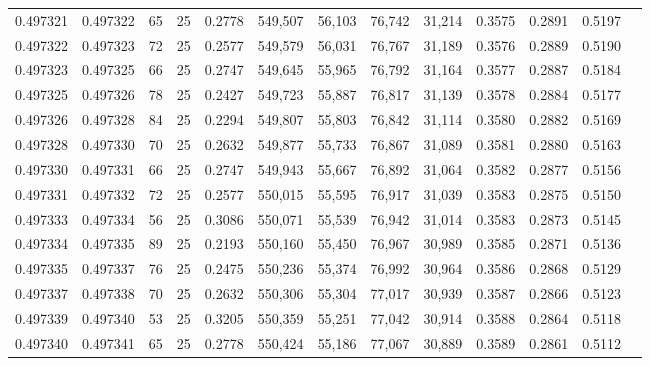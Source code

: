 \begin{tabular}{rrrrrrrrrrrrr}
0.497321 & 0.497322 &    65 &  25 &                                     0.2778 & 549,507 &  56,103 &  76,742 &  31,214 & 0.3575 & 0.2891 & 0.5197 \\
0.497322 & 0.497323 &    72 &  25 &                                     0.2577 & 549,579 &  56,031 &  76,767 &  31,189 & 0.3576 & 0.2889 & 0.5190 \\
0.497323 & 0.497325 &    66 &  25 &                                     0.2747 & 549,645 &  55,965 &  76,792 &  31,164 & 0.3577 & 0.2887 & 0.5184 \\
0.497325 & 0.497326 &    78 &  25 &                                     0.2427 & 549,723 &  55,887 &  76,817 &  31,139 & 0.3578 & 0.2884 & 0.5177 \\
0.497326 & 0.497328 &    84 &  25 &                                     0.2294 & 549,807 &  55,803 &  76,842 &  31,114 & 0.3580 & 0.2882 & 0.5169 \\
0.497328 & 0.497330 &    70 &  25 &                                     0.2632 & 549,877 &  55,733 &  76,867 &  31,089 & 0.3581 & 0.2880 & 0.5163 \\
0.497330 & 0.497331 &    66 &  25 &                                     0.2747 & 549,943 &  55,667 &  76,892 &  31,064 & 0.3582 & 0.2877 & 0.5156 \\
0.497331 & 0.497332 &    72 &  25 &                                     0.2577 & 550,015 &  55,595 &  76,917 &  31,039 & 0.3583 & 0.2875 & 0.5150 \\
0.497333 & 0.497334 &    56 &  25 &                                     0.3086 & 550,071 &  55,539 &  76,942 &  31,014 & 0.3583 & 0.2873 & 0.5145 \\
0.497334 & 0.497335 &    89 &  25 &                                     0.2193 & 550,160 &  55,450 &  76,967 &  30,989 & 0.3585 & 0.2871 & 0.5136 \\
0.497335 & 0.497337 &    76 &  25 &                                     0.2475 & 550,236 &  55,374 &  76,992 &  30,964 & 0.3586 & 0.2868 & 0.5129 \\
0.497337 & 0.497338 &    70 &  25 &                                     0.2632 & 550,306 &  55,304 &  77,017 &  30,939 & 0.3587 & 0.2866 & 0.5123 \\
0.497339 & 0.497340 &    53 &  25 &                                     0.3205 & 550,359 &  55,251 &  77,042 &  30,914 & 0.3588 & 0.2864 & 0.5118 \\
0.497340 & 0.497341 &    65 &  25 &                                     0.2778 & 550,424 &  55,186 &  77,067 &  30,889 & 0.3589 & 0.2861 & 0.5112 \\

\end{tabular}

